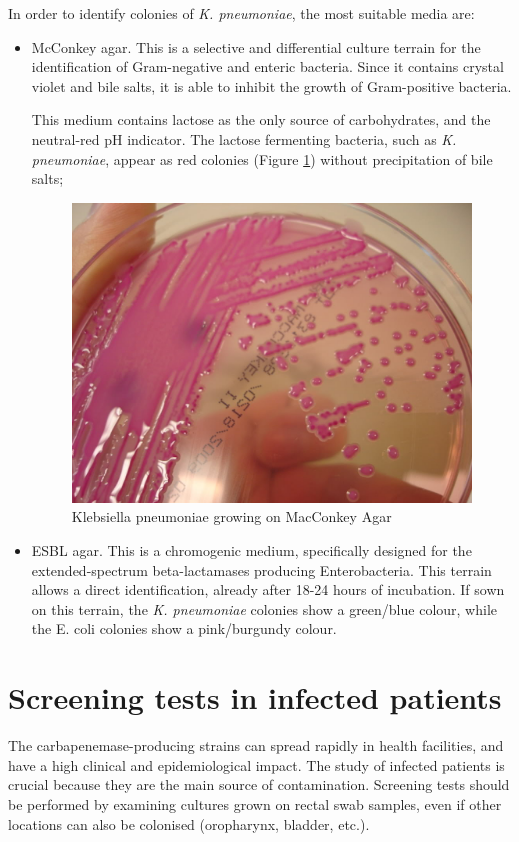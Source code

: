 \documentclass[11pt]{report}
\begin{document}
In order to identify colonies of \emph{K. pneumoniae}, the most suitable media are:
\begin{itemize}
\item McConkey agar.
This is a selective and differential culture terrain for the identification of Gram-negative and enteric bacteria.
Since it contains crystal violet and bile salts, it is able to inhibit the growth of Gram-positive bacteria. 

This medium contains lactose as the only source of carbohydrates, and the neutral-red pH indicator.
The lactose fermenting bacteria, such as \emph{K. pneumoniae}, appear as red colonies (Figure \ref{Kleb_MAC}) without precipitation of bile salts;

\begin{figure}[htp]
\centering
\includegraphics[scale=0.250]{img/KlebsiellaMAC.jpg}
\caption{Klebsiella pneumoniae growing on MacConkey Agar \cite{KlebsiellaMAC}}
\label{Kleb_MAC}
\end{figure}

\clearpage
\item ESBL agar.
This is a chromogenic medium, specifically designed for the extended-spectrum beta-lactamases producing Enterobacteria. This terrain allows a direct identification, already after 18-24 hours of incubation.
If sown on this terrain, the \emph{K. pneumoniae} colonies show a green/blue colour, while the E. coli colonies show a pink/burgundy colour.
\end{itemize}

\section{Screening tests in infected patients}
The carbapenemase-producing strains can spread rapidly in health facilities, and have a high clinical and epidemiological impact.
The study of infected patients is crucial because they are the main source of contamination.
Screening tests should be performed by examining cultures grown on rectal swab samples, even if other locations can also be colonised (oropharynx, bladder, etc.).
\end{document}
